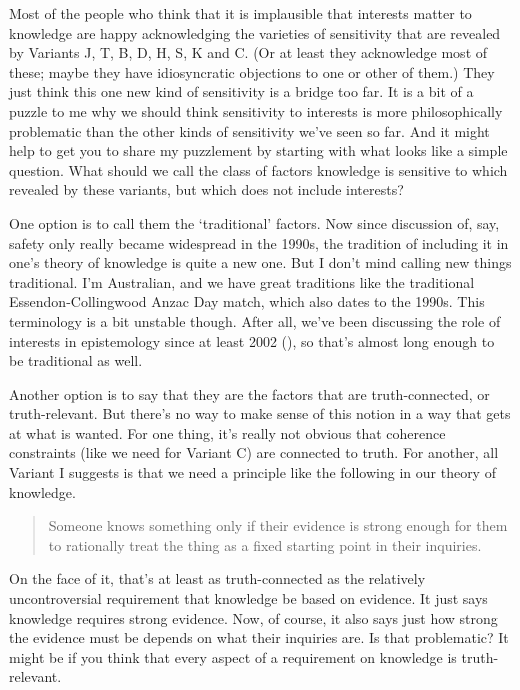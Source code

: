 \documentclass[
  12pt,
  letterpaper,
]{scrbook}
\begin{document}
Most of the people who think that it is implausible that interests
matter to knowledge are happy acknowledging the varieties of sensitivity
that are revealed by Variants J, T, B, D, H, S, K and C. (Or at least
they acknowledge most of these; maybe they have idiosyncratic objections
to one or other of them.) They just think this one new kind of
sensitivity is a bridge too far. It is a bit of a puzzle to me why we
should think sensitivity to interests is more philosophically
problematic than the other kinds of sensitivity we've seen so far. And
it might help to get you to share my puzzlement by starting with what
looks like a simple question. What should we call the class of factors
knowledge is sensitive to which revealed by these variants, but which
does not include interests?

One option is to call them the `traditional' factors. Now since
discussion of, say, safety only really became widespread in the 1990s,
the tradition of including it in one's theory of knowledge is quite a
new one. But I don't mind calling new things traditional. I'm
Australian, and we have great traditions like the traditional
Essendon-Collingwood Anzac Day match, which also dates to the 1990s.
This terminology is a bit unstable though. After all, we've been
discussing the role of interests in epistemology since at least 2002
(), so that's
almost long enough to be traditional as well.

Another option is to say that they are the factors that are
truth-connected, or truth-relevant. But there's no way to make sense of
this notion in a way that gets at what is wanted. For one thing, it's
really not obvious that coherence constraints (like we need for Variant
C) are connected to truth. For another, all Variant I suggests is that
we need a principle like the following in our theory of knowledge.

\begin{quote}
Someone knows something only if their evidence is strong enough for them
to rationally treat the thing as a fixed starting point in their
inquiries.
\end{quote}

On the face of it, that's at least as truth-connected as the relatively
uncontroversial requirement that knowledge be based on evidence. It just
says knowledge requires strong evidence. Now, of course, it also says
just how strong the evidence must be depends on what their inquiries
are. Is that problematic? It might be if you think that every aspect of
a requirement on knowledge is truth-relevant.
\end{document}
